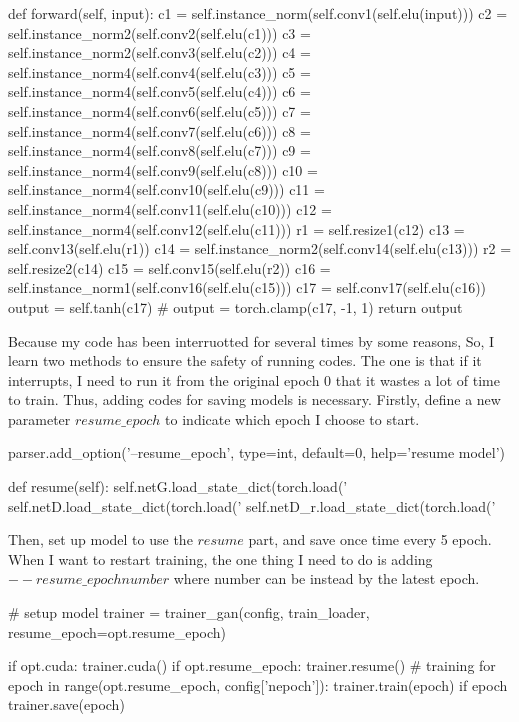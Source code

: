 \documentclass[a4paper]{article}
\begin{document}
\begin{python}
    def forward(self, input):
        c1 = self.instance_norm(self.conv1(self.elu(input)))
        c2 = self.instance_norm2(self.conv2(self.elu(c1)))
        c3 = self.instance_norm2(self.conv3(self.elu(c2)))
        c4 = self.instance_norm4(self.conv4(self.elu(c3)))
        c5 = self.instance_norm4(self.conv5(self.elu(c4)))
        c6 = self.instance_norm4(self.conv6(self.elu(c5)))
        c7 = self.instance_norm4(self.conv7(self.elu(c6)))
        c8 = self.instance_norm4(self.conv8(self.elu(c7)))
        c9 = self.instance_norm4(self.conv9(self.elu(c8)))
        c10 = self.instance_norm4(self.conv10(self.elu(c9)))
        c11 = self.instance_norm4(self.conv11(self.elu(c10)))
        c12 = self.instance_norm4(self.conv12(self.elu(c11)))
        r1 = self.resize1(c12)
        c13 = self.conv13(self.elu(r1))
        c14 = self.instance_norm2(self.conv14(self.elu(c13)))
        r2 = self.resize2(c14)
        c15 = self.conv15(self.elu(r2))
        c16 = self.instance_norm1(self.conv16(self.elu(c15)))
        c17 = self.conv17(self.elu(c16))
        output = self.tanh(c17)
        # output = torch.clamp(c17, -1, 1)
        return output
\end{python}

Because my code has been interruotted for several times by some reasons, So, I learn two methods to ensure the safety of running codes. The one is that if it interrupts, I need to run it from the original epoch 0 that it wastes a lot of time to train. Thus, adding codes for saving models is necessary. Firstly, define a new parameter $resume\_epoch$ to indicate which epoch I choose to start.
\begin{python}
parser.add_option('--resume_epoch', type=int, default=0, help='resume model')
\end{python}
\begin{python}
    def resume(self):
        self.netG.load_state_dict(torch.load('%
        self.netD.load_state_dict(torch.load('%
        self.netD_r.load_state_dict(torch.load('%
\end{python}
Then, set up model to use the $resume$ part, and save once time every 5 epoch. When I want to restart training, the one thing I need to do is adding $--resume\_epoch number$ where number can be instead by the latest epoch.
\begin{python}
# setup model
    trainer = trainer_gan(config, train_loader, resume_epoch=opt.resume_epoch)

    if opt.cuda:
        trainer.cuda()
    if opt.resume_epoch:
        trainer.resume()
    # training
    for epoch in range(opt.resume_epoch, config['nepoch']):
        trainer.train(epoch)
        if epoch %
            trainer.save(epoch)
\end{python}            
\end{document}
